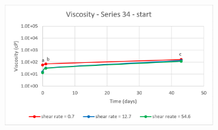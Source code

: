 \begin{appendices}
\begin{figure}
{\begin{subfigure}[b]{0.6\textwidth}
     \end{subfigure}
     \begin{subfigure}[b]{0.6\textwidth}
         \centering
         \includegraphics[width=\textwidth]{img/visc/34-1.png}
     \end{subfigure}
    }\\
\end{figure}
\end{appendices}
